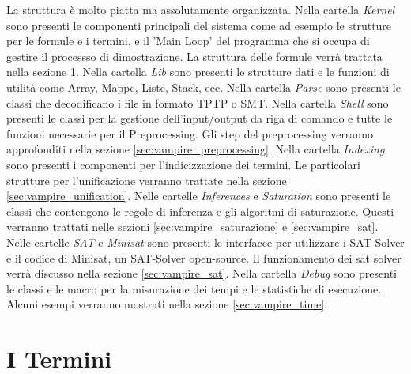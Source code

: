 \documentclass[./main.tex]{subfiles}
\begin{document}
La struttura è molto piatta ma assolutamente organizzata.
Nella cartella \textit{Kernel} sono presenti le componenti principali del sistema come ad esempio le strutture per le formule e i termini,
e il 'Main Loop' del programma che si occupa di gestire il processso di dimostrazione.
La struttura delle formule verrà trattata nella sezione \ref{sec:vampire_term}.
Nella cartella \textit{Lib} sono presenti le strutture dati e le funzioni di utilità come Array, Mappe, Liste, Stack, ecc.
Nella cartella \textit{Parse} sono presenti le classi che decodificano 
i file in formato TPTP o SMT. 
Nella cartella \textit{Shell} sono presenti le classi per la gestione dell'input/output da riga di comando
e tutte le funzioni necessarie per il Preprocessing.
Gli step del preprocessing verranno approfonditi nella sezione \ref{sec:vampire_preprocessing}.
Nella cartella \textit{Indexing} sono presenti i componenti per l'indicizzazione dei termini.
Le particolari strutture per l'unificazione verranno trattate nella sezione \ref{sec:vampire_unification}.
Nelle cartelle \textit{Inferences} e \textit{Saturation} sono presenti le classi che contengono le regole di inferenza
e gli algoritmi di saturazione. Questi verranno trattati nelle sezioni \ref{sec:vampire_saturazione} e \ref{sec:vampire_sat}.
Nelle cartelle \textit{SAT} e \textit{Minisat} sono presenti le interfacce per utilizzare i SAT-Solver e
il codice di Minisat, un SAT-Solver open-source. 
Il funzionamento dei sat solver verrà discusso nella sezione \ref{sec:vampire_sat}.
Nella cartella \textit{Debug} sono presenti le classi e le macro per la misurazione dei tempi e le statistiche di esecuzione.
Alcuni esempi verranno mostrati nella sezione \ref{sec:vampire_time}.


\section{I Termini} \label{sec:vampire_term}
\end{document}
